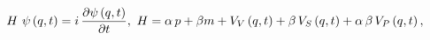 \begin{equation}
H\,\,\psi \left( q,t\right) =i\,\frac{\partial \psi \left( q,t\right) }{%
\partial t},\,\,H=\alpha \,p+\beta m+V_{V}\left( q,t\right) +\beta
\,V_{S}\left( q,t\right) +\alpha \,\beta \,V_{P}\left( q,t\right) ,
\label{1}
\end{equation}

